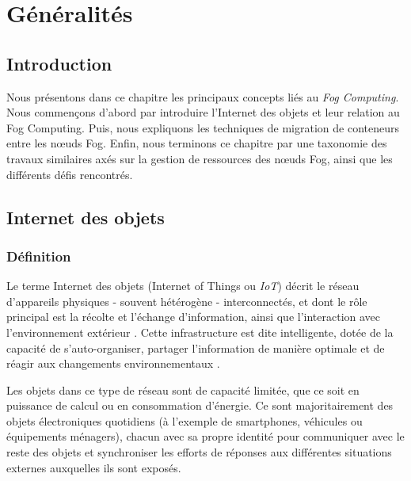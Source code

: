 \chapter{Généralités}

\section{Introduction}
Nous présentons dans ce chapitre les principaux concepts liés au \emph{\gls{Fog Computing}}. Nous commençons d'abord par introduire l'Internet des objets et leur relation au Fog Computing. Puis, nous expliquons les techniques de migration de conteneurs entre les nœuds Fog. Enfin, nous terminons ce chapitre par une taxonomie des travaux similaires axés sur la gestion de ressources des nœuds Fog, ainsi que les différents défis rencontrés. 

\section{Internet des objets}
\subsection{Définition}
Le terme Internet des objets (Internet of Things ou \emph{\gls{IoT}}) décrit le réseau d'appareils physiques - souvent hétérogène - interconnectés, et dont le rôle principal est la récolte et l'échange d'information, ainsi que l'interaction avec l'environnement extérieur \cite{patel2016}. Cette infrastructure est dite intelligente, dotée de la capacité de s'auto-organiser, partager l'information de manière optimale et de réagir aux changements environnementaux \cite{madakam2015}.\par
Les objets dans ce type de réseau sont de capacité limitée, que ce soit en puissance de calcul ou en consommation d'énergie. Ce sont majoritairement des objets électroniques quotidiens (à l'exemple de smartphones, véhicules ou équipements ménagers), chacun avec sa propre identité pour communiquer avec le reste des objets et synchroniser les efforts de réponses aux différentes situations externes auxquelles ils sont exposés.

